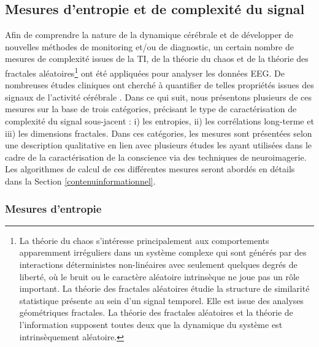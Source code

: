 \subsection{Mesures d'entropie et de complexité du signal}
\label{mesurescomplexitesignal}

Afin de comprendre la nature de la dynamique cérébrale et de développer de nouvelles méthodes de monitoring et/ou de diagnostic, un certain nombre de mesures de complexité issues de la TI, de la théorie du chaos et de la théorie des fractales aléatoires\footnote{La théorie du chaos s'intéresse principalement aux comportements apparemment irréguliers dans un système complexe qui sont générés par des interactions déterministes non-linéaires avec seulement quelques degrés de liberté, où le bruit ou le caractère aléatoire intrinsèque ne joue pas un rôle important. La théorie des fractales aléatoires étudie la structure de similarité statistique présente au sein d'un signal temporel. Elle est issue des analyses géométriques fractales. La théorie des fractales aléatoires et la théorie de l'information supposent toutes deux que la dynamique du système est intrinsèquement aléatoire.} ont été appliquées pour analyser les données EEG. 
De nombreuses études cliniques ont cherché à quantifier de telles propriétés issues des signaux de l'activité cérébrale \citep{gao2011complexity, kannathal2005entropies, lenne2013decrease, pezard1996depression, pezard1998entropy, pezard2001investigation, pritchard1992brain, pritchard1994eeg, torres2000relative}. 
Dans ce qui suit, nous présentons plusieurs de ces mesures sur la base de trois catégories, précisant le type de caractérisation de complexité du signal sous-jacent : i) les entropies, ii) les corrélations long-terme et iii) les dimensions fractales. 
Dans ces catégories, les mesures sont présentées selon une description qualitative en lien avec plusieurs études les ayant utilisées dans le cadre de la caractérisation de la conscience via des techniques de neuroimagerie. 
Les algorithmes de calcul de ces différentes mesures seront abordés en détails dans la Section \ref{contenuinformationnel}. 

\subsubsection{Mesures d'entropie}
\label{mesuresdentropie}

